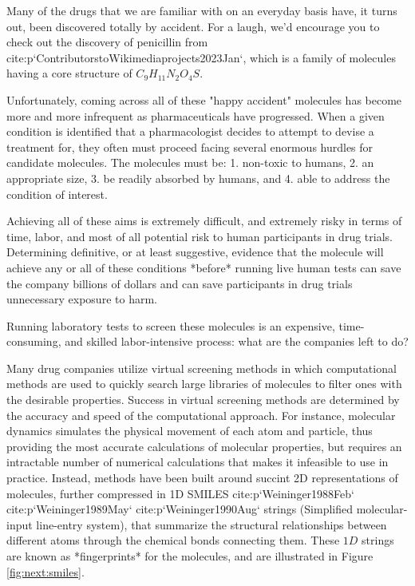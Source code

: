 Many of the drugs that we are familiar with on an everyday basis have, it turns out, been discovered totally by accident. For a laugh, we'd encourage you to check out the discovery of penicillin from {cite:p}`ContributorstoWikimediaprojects2023Jan`, which is a family of molecules having a core structure of $C_9H_{11}N_2O_4S$. 

Unfortunately, coming across all of these "happy accident" molecules has become more and more infrequent as pharmaceuticals have progressed. When a given condition is identified that a pharmacologist decides to attempt to devise a treatment for, they often must proceed facing several enormous hurdles for candidate molecules. The molecules must be:
1. non-toxic to humans,
2. an appropriate size,
3. be readily absorbed by humans, and
4. able to address the condition of interest.

Achieving all of these aims is extremely difficult, and extremely risky in terms of time, labor, and most of all potential risk to human participants in drug trials. Determining definitive, or at least suggestive, evidence that the molecule will achieve any or all of these conditions *before* running live human tests can save the company billions of dollars and can save participants in drug trials unnecessary exposure to harm.

Running laboratory tests to screen these molecules is an expensive, time-consuming, and skilled labor-intensive process: what are the companies left to do?

Many drug companies utilize virtual screening methods in which computational methods are used to quickly search large libraries of molecules to filter ones with the desirable properties. Success in virtual screening methods are determined by the accuracy and speed of the computational approach. For instance, molecular dynamics simulates the physical movement of each atom and particle, thus providing the most accurate calculations of molecular properties, but requires an intractable number of numerical calculations that makes it infeasible to use in practice. Instead, methods have been built around succint 2D representations of molecules, further compressed in 1D SMILES {cite:p}`Weininger1988Feb` {cite:p}`Weininger1989May` {cite:p}`Weininger1990Aug` strings (Simplified molecular-input line-entry system), that summarize the structural relationships between different atoms through the chemical bonds connecting them. These $1D$ strings are known as *fingerprints* for the molecules, and are illustrated in Figure \ref{fig:next:smiles}.

